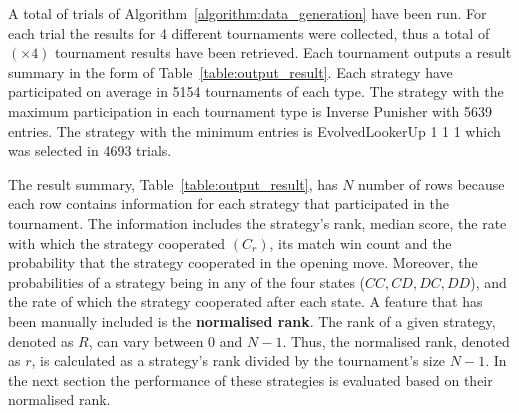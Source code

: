 \documentclass{article}
\newcommand{\uniquenumberofseeds}{}
\newcommand{\numberofalltournaments}{}
\begin{document}
A total of \uniquenumberofseeds trials of Algorithm~\ref{algorithm:data_generation} have been
run. For each trial the results for 4 different tournaments were collected,
thus a total of \numberofalltournaments $(\uniquenumberofseeds \times 4)$ tournament results have been
retrieved. Each tournament outputs a result summary in the form of
Table~\ref{table:output_result}. Each strategy have participated on average in
5154 tournaments of each type. The strategy with the maximum participation in each
tournament type is Inverse Punisher with 5639 entries. The strategy with the
minimum entries is EvolvedLookerUp 1 1 1 which was selected in 4693 trials.

The result summary, Table~\ref{table:output_result}, has \(N\) number of rows
because each row contains information for each strategy that participated in the
tournament. The information includes the strategy's rank, median score, the rate
with which the strategy cooperated $(C_r)$, its match win count and the
probability that the strategy cooperated in the opening move. Moreover, the
probabilities of a strategy being in any of the four states ($CC, CD, DC, DD$),
and the rate of which the strategy cooperated after each state. A feature that
has been manually included is the \textbf{normalised rank}. The rank of a given
strategy, denoted as \(R\), can vary between 0 and \(N-1\). Thus, the normalised rank,
denoted as $r$, is calculated as a strategy's rank divided by the tournament's
size \(N - 1\). In the next section the performance of these strategies is evaluated
based on their normalised rank.
\end{document}
